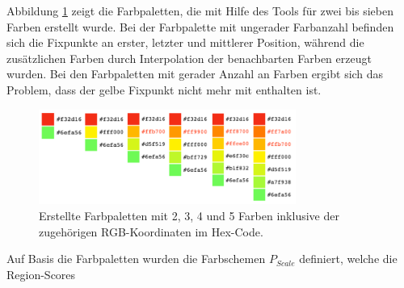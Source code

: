 Abbildung \ref{fig:color-swatches} zeigt die Farbpaletten, die mit Hilfe des Tools für zwei bis sieben Farben erstellt wurde. Bei der Farbpalette mit ungerader Farbanzahl befinden sich die Fixpunkte an erster, letzter und mittlerer Position, während die zusätzlichen Farben durch Interpolation der benachbarten Farben erzeugt wurden. Bei den Farbpaletten mit gerader Anzahl an Farben ergibt sich das Problem, dass der gelbe Fixpunkt nicht mehr mit enthalten ist.

\begin{figure}[h]
	\centering
	\includegraphics[width=0.75\textwidth]{bilder/colorpics.png}
	\caption{Erstellte Farbpaletten mit 2, 3, 4 und 5 Farben inklusive der zugehörigen RGB-Koordinaten im Hex-Code.}
	\label{fig:color-swatches}
\end{figure}

Auf Basis die Farbpaletten wurden die Farbschemen $P_{Scale}$ definiert, welche die Region-Scores 
